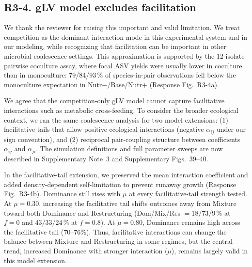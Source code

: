 \subsection*{R3-4. gLV model excludes facilitation}


\responselabel
We thank the reviewer for raising this important and valid limitation. We treat competition as the dominant interaction mode in this experimental system and in our modeling, while recognizing that facilitation can be important in other microbial coalescence settings. This approximation is supported by the 12-isolate pairwise coculture assay, where focal ASV yields were usually lower in coculture than in monoculture: 79/84/93\,\% of species-in-pair observations fell below the monoculture expectation in Nutr$-$/Base/Nutr$+$ (Response Fig.~R3-4a).

We agree that the competition-only gLV model cannot capture facilitative interactions such as metabolic cross-feeding. To consider the broader ecological context, we ran the same coalescence analysis for two model extensions: (1) facilitative tails that allow positive ecological interactions (negative $\alpha_{ij}$ under our sign convention), and (2) reciprocal pair-coupling structure between coefficients $\alpha_{ij}$ and $\alpha_{ji}$. The simulation definitions and full parameter sweeps are now described in Supplementary Note~3 and Supplementary Figs.~39--40.

In the facilitative-tail extension, we preserved the mean interaction coefficient and added density-dependent self-limitation to prevent runaway growth (Response Fig.~R3-4b). Dominance still rises with $\mu$ at every facilitative-tail strength tested. At $\mu=0.30$, increasing the facilitative tail shifts outcomes away from Mixture toward both Dominance and Restructuring (Dom/Mix/Res $=18/73/9\,\%$ at $f=0$ and $43/33/24\,\%$ at $f=0.8$). At $\mu=0.80$, Dominance remains high across the facilitative tail (70--76\%). Thus, facilitative interactions can change the balance between Mixture and Restructuring in some regimes, but the central trend, increased Dominance with stronger interaction ($\mu$), remains largely valid in this model extension.

